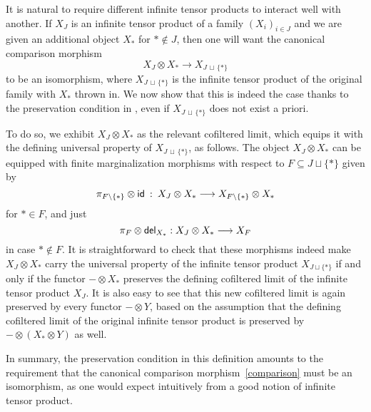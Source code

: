 \documentclass[11pt]{article}
\begin{document}
\begin{remark}
	\label{preserve}
	It is natural to require different infinite tensor products to interact well with another. If $X_J$ is an infinite tensor product of a family $(X_i)_{i \in J}$ and we are given an additional object $X_\ast$ for $\ast \not \in J$, then one will want the canonical comparison morphism
	\begin{equation}
		\label{comparison}
		X_J \otimes X_\ast \longrightarrow X_{J \,\sqcup\, \{\ast\}}
	\end{equation}
	to be an isomorphism, where $X_{J \,\sqcup\, \{\ast\}}$ is the infinite tensor product of the original family with $X_\ast$ thrown in. We now show that this is indeed the case thanks to the preservation condition in , even if $X_{J \,\sqcup\, \{\ast\}}$ does not exist a priori.
	
	To do so, we exhibit $X_J \otimes X_\ast$ as the relevant cofiltered limit, which equips it with the defining universal property of $X_{J \,\sqcup\, \{\ast\}}$, as follows. The object $X_J \otimes X_\ast$ can be equipped with finite marginalization morphisms with respect to $F \subseteq J \sqcup \{\ast\}$ given by
	\[
		\pi_{F \setminus \{\ast\}} \otimes \mathsf{id} \: : \: X_J \otimes X_\ast \longrightarrow X_{F \setminus \{\ast\}} \otimes X_\ast
	\]
	for $\ast \in F$, and just
	\[
		\pi_F \otimes \mathsf{del}_{X_\ast} : X_J \otimes X_\ast \longrightarrow X_F 
	\]
	in case $\ast \not \in F$. It is straightforward to check that these morphisms indeed make $X_J \otimes X_\ast$ carry the universal property of the infinite tensor product $X_{J \sqcup \{\ast\}}$ if and only if the functor $- \otimes X_\ast$ preserves the defining cofiltered limit of the infinite tensor product $X_J$. It is also easy to see that this new cofiltered limit is again preserved by every functor $- \otimes Y$, based on the assumption that the defining cofiltered limit of the original infinite tensor product is preserved by $- \otimes (X_\ast \otimes Y)$ as well.

	In summary, the preservation condition in this definition amounts to the requirement that the canonical comparison morphism~\eqref{comparison} must be an isomorphism, as one would expect intuitively from a good notion of infinite tensor product. 
\end{remark}
\end{document}

